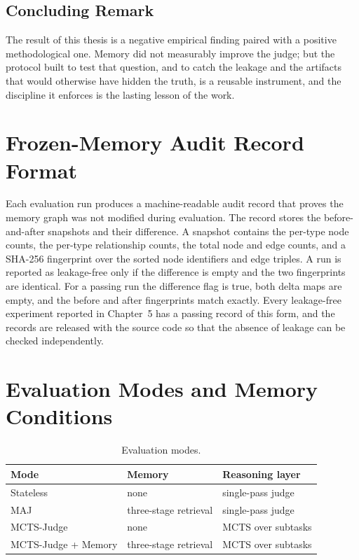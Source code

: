 \documentclass[14pt,a4paper]{extreport}
\begin{document}
\section{Concluding Remark}

The result of this thesis is a negative empirical finding paired with a positive methodological one. Memory did not measurably improve the judge; but the protocol built to test that question, and to catch the leakage and the artifacts that would otherwise have hidden the truth, is a reusable instrument, and the discipline it enforces is the lasting lesson of the work.




\appendix

\chapter{Frozen-Memory Audit Record Format}

Each evaluation run produces a machine-readable audit record that proves the memory graph was not modified during evaluation. The record stores the before-and-after snapshots and their difference. A snapshot contains the per-type node counts, the per-type relationship counts, the total node and edge counts, and a SHA-256 fingerprint over the sorted node identifiers and edge triples. A run is reported as leakage-free only if the difference is empty and the two fingerprints are identical. For a passing run the difference flag is true, both delta maps are empty, and the before and after fingerprints match exactly. Every leakage-free experiment reported in Chapter~5 has a passing record of this form, and the records are released with the source code so that the absence of leakage can be checked independently.

\chapter{Evaluation Modes and Memory Conditions}

\begin{table}[h]
\centering
\caption{Evaluation modes.}
\label{tab:appmodes}
\begin{tabular}{lll}
\toprule
Mode & Memory & Reasoning layer \\
\midrule
Stateless & none & single-pass judge \\
MAJ & three-stage retrieval & single-pass judge \\
MCTS-Judge & none & MCTS over subtasks \\
MCTS-Judge + Memory & three-stage retrieval & MCTS over subtasks \\
\bottomrule
\end{tabular}
\end{table}
\end{document}
